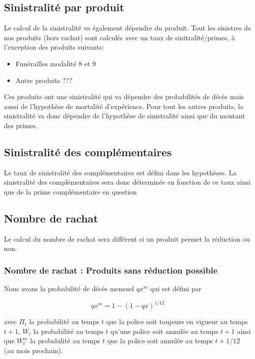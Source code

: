 \documentclass{article}
\begin{document}
\subsection{Sinistralité par produit}
Le calcul de la sinistralité va également dépendre du produit. Tout les sinistres de nos produits (hors rachat) sont calculés avec un taux de sinitralité/primes, à l'exception des produits suivants:

\begin{itemize}
\item Funérailles modalité 8 et 9
\item Autre produits ???
\end{itemize}


Ces produits ont une sinistralité qui va dépendre des probabilités de décès mais aussi de l'hypothèse de mortalité d'expérience. Pour tout les autres produits, la sinistralité va donc dépendre de l'hypothèse de sinistralité ainsi que du montant des primes.
 
 



\subsection{Sinistralité des complémentaires}


Le taux de sinistralité des complémentaires est défini dans les hypothèses. La sinistralité des complémentaires sera donc déterminée en fonction de ce taux ainsi que de la prime complémentaire en question
 
\subsection{Nombre de rachat}

Le calcul du nombre de rachat sera différent si un produit permet la réduction ou non.

\subsubsection{Nombre de rachat : Produits sans réduction possible}

Nous avons la probabilité de décès mensuel $qx^m$ qui est défini par

\begin{equation}
  qx^m = 1-(1-qx)^{1/12}
\end{equation}

\noindent avec ${\Pi}_{t}$ la probabilité au temps $t$ que la police soit toujours en vigueur au temps $t+1$, $W_{t}$ la probabilité au temps $t$ qu'une police soit annulée au temps $t+1$ ainsi que $W^m_{t}$ la probabilité au temps $t$ que la police soit annulée au temps $t + 1/12$ (au mois prochain).
\end{document}
